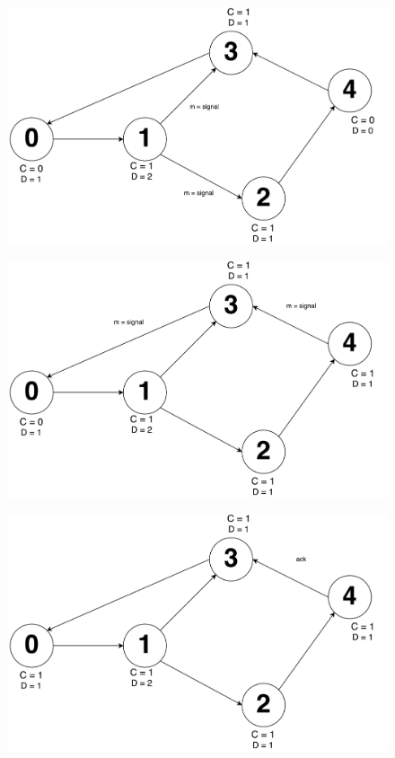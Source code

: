 \documentclass[times]{article}
\begin{document}
		\begin{figure}[H]
			\includegraphics[width=\linewidth]{q2/3.pdf}
		\end{figure}
		\begin{figure}[H]
			\includegraphics[width=\linewidth]{q2/4.pdf}
		\end{figure}
		\begin{figure}[H]
			\includegraphics[width=\linewidth]{q2/5.pdf}
		\end{figure}
\end{document}
